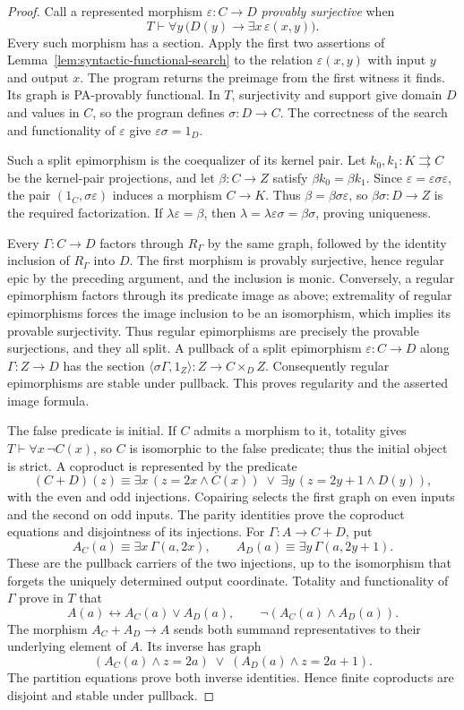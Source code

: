 \begin{proof}
Call a represented morphism $\varepsilon:C\to D$
\emph{provably surjective} when
\[
 T\vdash\forall y\,
       \bigl(D(y)\longrightarrow\exists x\,\varepsilon(x,y)\bigr).
\]
Every such morphism has a section. Apply the first two assertions
of Lemma~\ref{lem:syntactic-functional-search} to the relation
$\varepsilon(x,y)$ with input $y$ and output $x$. The program returns the preimage from the first witness it finds.
Its graph is PA-provably functional. In $T$, surjectivity and
support give domain $D$ and values in $C$, so the program
defines $\sigma:D\to C$. The correctness of
the search and functionality of $\varepsilon$ give
$\varepsilon\sigma=1_D$.

Such a split epimorphism is the coequalizer of its kernel pair.
Let $k_0,k_1:K\rightrightarrows C$ be the kernel-pair
projections, and let $\beta:C\to Z$ satisfy
$\beta k_0=\beta k_1$. Since
$\varepsilon=\varepsilon\sigma\varepsilon$, the pair
$(1_C,\sigma\varepsilon)$ induces a morphism $C\to K$.
Thus $\beta=\beta\sigma\varepsilon$, so
$\beta\sigma:D\to Z$ is the required factorization. If
$\lambda\varepsilon=\beta$, then
$\lambda=\lambda\varepsilon\sigma=\beta\sigma$, proving
uniqueness.

Every $\Gamma:C\to D$ factors through $R_\Gamma$ by the same
graph, followed by the identity inclusion of $R_\Gamma$ into $D$.
The first morphism is provably surjective, hence regular epic by
the preceding argument, and the inclusion is monic.
Conversely, a regular epimorphism factors through its predicate
image as above; extremality of regular epimorphisms forces the
image inclusion to be an isomorphism, which implies its provable
surjectivity. Thus regular epimorphisms are precisely the provable
surjections, and they all split. A pullback of a split epimorphism
$\varepsilon:C\to D$ along $\Gamma:Z\to D$ has the section
$\langle\sigma\Gamma,1_Z\rangle:Z\to C\times_D Z$.
Consequently regular epimorphisms are stable under pullback.
This proves regularity and the asserted image formula.

The false predicate is initial. If $C$ admits a morphism to it,
totality gives $T\vdash\forall x\,\neg C(x)$, so $C$ is
isomorphic to the false predicate; thus the initial object is
strict. A coproduct is represented by the predicate
\[
 (C+D)(z)\equiv
   \exists x\,(z=2x\land C(x))\;\lor\;
   \exists y\,(z=2y+1\land D(y)),
\]
with the even and odd injections. Copairing selects the first graph
on even inputs and the second on odd inputs. The parity identities prove
the coproduct equations and disjointness of its injections.
For $\Gamma:A\to C+D$, put
\[
 A_C(a)\equiv\exists x\,\Gamma(a,2x),\qquad
 A_D(a)\equiv\exists y\,\Gamma(a,2y+1).
\]
These are the pullback carriers of the two injections, up to the
isomorphism that forgets the uniquely determined output coordinate.
Totality and functionality of $\Gamma$ prove in $T$ that
\[
 A(a)\longleftrightarrow A_C(a)\lor A_D(a),\qquad
 \neg(A_C(a)\land A_D(a)).
\]
The morphism $A_C+A_D\to A$ sends both summand representatives
to their underlying element of $A$.
Its inverse has graph
\[
 (A_C(a)\land z=2a)\;\lor\;(A_D(a)\land z=2a+1).
\]
The partition equations prove both inverse identities. Hence finite
coproducts are disjoint and stable under pullback.


\end{proof}
